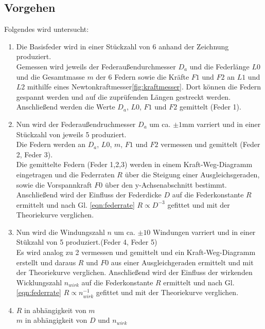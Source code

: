 \subsection{Vorgehen}
Folgendes wird untersucht:
\begin{enumerate}
    \item   Die Basisfeder wird in einer Stückzahl von 6 anhand der Zeichnung produziert.\\
            Gemessen wird jeweils der Federaußendurchmesser $D_a$ und die Federlänge 
            $L0$ und die Gesamtmasse $m$ der 6 Federn sowie die Kräfte $F1$ und $F2$ an $L1$ und $L2$ mithilfe eines Newtonkraftmesser\ref{fig:kraftmesser}.
            Dort können die Federn gespannt werden und auf die zuprüfenden Längen gestreckt werden.\\
            Anschließend werden die Werte $D_a$, $L0$, $F1$ und $F2$ gemittelt (Feder 1).

    \item   Nun wird der Federaußendruchmesser $D_a$ um ca. $\pm1$mm varriert und in einer 
            Stückzahl von jeweils 5 produziert.\\
            Die Federn werden an $D_a$, $L0$, $m$, $F1$ und $F2$ vermessen und gemittelt (Feder 2, Feder 3).\\
            Die gemittelte Federn (Feder 1,2,3) werden in einem Kraft-Weg-Diagramm eingetragen und
            die Federraten $R$ über die Steigung einer Ausgleichsgeraden, sowie die Vorspannkraft $F0$ 
            über den y-Achsenabschnitt bestimmt.\\
            Anschließend wird der Einfluss der Federdicke $D$ auf die Federkonstante $R$ ermittelt
            und nach Gl. \ref{eqn:federrate} $R \propto D^{-3}$ gefittet und mit der Theoriekurve verglichen.

    \item   Nun wird die Windungszahl $n$ um ca. $\pm 10$ Windungen varriert und in einer Stükzahl von 5 produziert.(Feder 4, Feder 5)\\
            Es wird analog zu 2 vermessen und gemittelt und ein Kraft-Weg-Diagramm erstellt und
            daraus $R$ und $F0$ aus einer Ausgleichgeraden ermittelt und mit der Theoriekurve verglichen.
            Anschließend wird der Einfluss der wirkenden Wicklungszahl $n_{wirk}$ auf die Federkonstante $R$ ermittelt
            und nach Gl. \ref{eqn:federrate} $R \propto n_{wirk}^{-1}$ gefittet und mit der Theoriekurve verglichen.

    \item   $R$ in abhängigkeit von $m$\\
            $m$ in abhängigkeit von $D$ und $n_{wirk}$  
\end{enumerate}
 